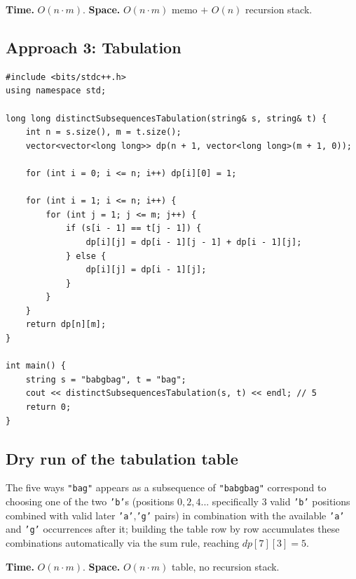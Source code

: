\begin{complexitybox}
\textbf{Time.} $O(n \cdot m)$.
\textbf{Space.} $O(n \cdot m)$ memo $+$ $O(n)$ recursion stack.
\end{complexitybox}

\subsection*{Approach 3: Tabulation}

\begin{lstlisting}
#include <bits/stdc++.h>
using namespace std;

long long distinctSubsequencesTabulation(string& s, string& t) {
    int n = s.size(), m = t.size();
    vector<vector<long long>> dp(n + 1, vector<long long>(m + 1, 0));

    for (int i = 0; i <= n; i++) dp[i][0] = 1;

    for (int i = 1; i <= n; i++) {
        for (int j = 1; j <= m; j++) {
            if (s[i - 1] == t[j - 1]) {
                dp[i][j] = dp[i - 1][j - 1] + dp[i - 1][j];
            } else {
                dp[i][j] = dp[i - 1][j];
            }
        }
    }
    return dp[n][m];
}

int main() {
    string s = "babgbag", t = "bag";
    cout << distinctSubsequencesTabulation(s, t) << endl; // 5
    return 0;
}
\end{lstlisting}

\subsection*{Dry run of the tabulation table}


The five ways \texttt{"bag"} appears as a subsequence of
\texttt{"babgbag"} correspond to choosing one of the two \texttt{'b'}s
(positions $0,2,4$... specifically $3$ valid \texttt{'b'} positions
combined with valid later \texttt{'a'},\texttt{'g'} pairs) in
combination with the available \texttt{'a'} and \texttt{'g'}
occurrences after it; building the table row by row accumulates these
combinations automatically via the sum rule, reaching
$\textit{dp}[7][3]=5$.

\begin{complexitybox}
\textbf{Time.} $O(n \cdot m)$.
\textbf{Space.} $O(n \cdot m)$ table, no recursion stack.
\end{complexitybox}

